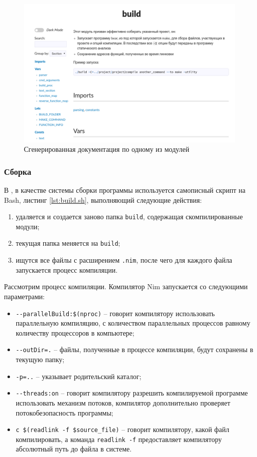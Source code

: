 \begin{figure}[!hbtp]
    \includegraphics[width=\textwidth,height=\textheight,keepaspectratio]{images/nim_doc_gen.png}
    \caption{Сгенерированная документация по одному из модулей {\ProgModule}\label{fig:nim-doc-gen}}
\end{figure}

\subsubsection{Сборка {\ProgModule}}\label{sec:ch3/sec1/sub1}
В {\ProgModule}, в качестве системы сборки программы используется самописный скрипт на Bash, 
листинг \autoref{lst:build.sh}, выполняющий следующие действия:
\begin{enumerate}[label={\arabic*)}]
    \item удаляется и создается заново папка \verb|build|, содержащая скомпилированные модули;
    \item текущая папка меняется на \verb|build|;
    \item ищутся все файлы с расширением \verb|.nim|, после чего для каждого файла
        запускается процесс компиляции.
\end{enumerate}

Рассмотрим процесс компиляции. Компилятор Nim запускается со следующими параметрами:
\begin{itemize}
    \item \verb|--parallelBuild:$(nproc)| -- говорит компилятору 
        использовать параллельную компиляцию, с количеством параллельных процессов равному
        количеству процессоров в компьютере;
    \item \verb|--outDir=.| -- файлы, полученные в процессе компиляции, будут сохранены в 
        текущую папку;
    \item \verb|-p=..| -- указывает родительский каталог;
    \item \verb|--threads:on| -- говорит компилятору разрешить компилируемой программе использовать
        механизм потоков, компилятор дополнительно проверяет потокобезопасность программы;
    \item \verb|с $(readlink -f $source_file)| -- говорит компилятору, какой файл компилировать,
        а команда \verb|readlink -f| предоставляет компилятору абсолютный путь до файла в системе.
\end{itemize}

